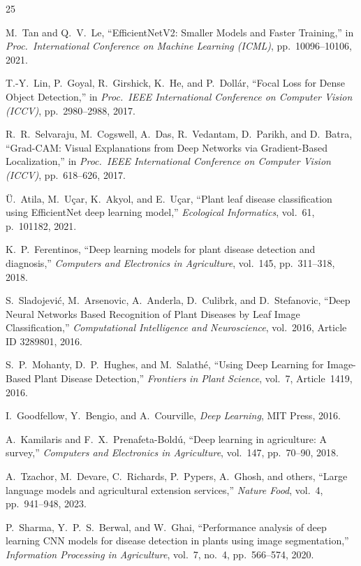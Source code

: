 \documentclass[12pt,a4paper]{report}
\begin{document}
\begin{thebibliography}{25}

M.~Tan and Q.~V.~Le,
``EfficientNetV2: Smaller Models and Faster Training,''
in \textit{Proc.\ International Conference on Machine Learning (ICML)}, pp.~10096--10106, 2021.

T.-Y.~Lin, P.~Goyal, R.~Girshick, K.~He, and P.~Doll\'{a}r,
``Focal Loss for Dense Object Detection,''
in \textit{Proc.\ IEEE International Conference on Computer Vision (ICCV)}, pp.~2980--2988, 2017.

R.~R.~Selvaraju, M.~Cogswell, A.~Das, R.~Vedantam, D.~Parikh, and D.~Batra,
``Grad-CAM: Visual Explanations from Deep Networks via Gradient-Based Localization,''
in \textit{Proc.\ IEEE International Conference on Computer Vision (ICCV)}, pp.~618--626, 2017.

\"{U}.~Atila, M.~U\c{c}ar, K.~Akyol, and E.~U\c{c}ar,
``Plant leaf disease classification using EfficientNet deep learning model,''
\textit{Ecological Informatics}, vol.~61, p.~101182, 2021.

K.~P.~Ferentinos,
``Deep learning models for plant disease detection and diagnosis,''
\textit{Computers and Electronics in Agriculture}, vol.~145, pp.~311--318, 2018.

S.~Sladojevi\'{c}, M.~Arsenovic, A.~Anderla, D.~Culibrk, and D.~Stefanovic,
``Deep Neural Networks Based Recognition of Plant Diseases by Leaf Image Classification,''
\textit{Computational Intelligence and Neuroscience}, vol.~2016, Article ID 3289801, 2016.

S.~P.~Mohanty, D.~P.~Hughes, and M.~Salath\'{e},
``Using Deep Learning for Image-Based Plant Disease Detection,''
\textit{Frontiers in Plant Science}, vol.~7, Article~1419, 2016.

I.~Goodfellow, Y.~Bengio, and A.~Courville,
\textit{Deep Learning},
MIT Press, 2016.

A.~Kamilaris and F.~X.~Prenafeta-Bold\'{u},
``Deep learning in agriculture: A survey,''
\textit{Computers and Electronics in Agriculture}, vol.~147, pp.~70--90, 2018.

A.~Tzachor, M.~Devare, C.~Richards, P.~Pypers, A.~Ghosh, and others,
``Large language models and agricultural extension services,''
\textit{Nature Food}, vol.~4, pp.~941--948, 2023.

P.~Sharma, Y.~P.~S.~Berwal, and W.~Ghai,
``Performance analysis of deep learning CNN models for disease detection in plants using image segmentation,''
\textit{Information Processing in Agriculture}, vol.~7, no.~4, pp.~566--574, 2020.


\end{thebibliography}
\end{document}
